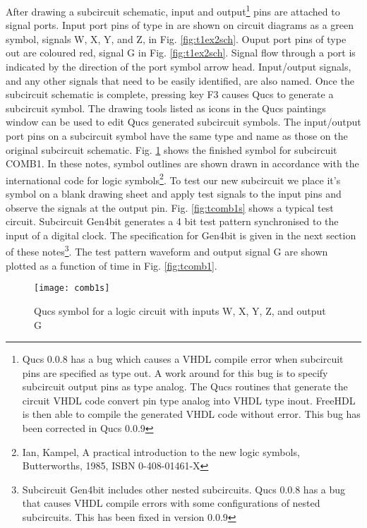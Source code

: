 After drawing a subcircuit schematic, input and output\footnote{Qucs
  0.0.8 has a bug which causes a VHDL compile error when subcircuit
  pins are specified as type out. A work around for this bug is to
  specify subcircuit output pins as type analog.  The Qucs routines
  that generate the circuit VHDL code convert pin type analog into
  VHDL type inout. FreeHDL is then able to compile the generated VHDL
  code without error. This bug has been corrected in Qucs 0.0.9} pins
are attached to signal ports.  Input port pins of type in are shown on
circuit diagrams as a green symbol, signals W, X, Y, and Z, in
Fig. \ref{fig:t1ex2sch}.  Ouput port pins of type out are coloured
red, signal G in Fig. \ref{fig:t1ex2sch}. Signal flow through a port
is indicated by the direction of the port symbol arrow
head. Input/output signals, and any other signals that need to be
easily identified, are also named.  Once the subcircuit schematic is
complete, pressing key F3 causes Qucs to generate a subcircuit symbol.
The drawing tools listed as icons in the Qucs paintings window can be
used to edit Qucs generated subcircuit symbols.  The input/output port
pins on a subcircuit symbol have the same type and name as those on
the original subcircuit schematic.  Fig. \ref{fig:comb1s} shows the
finished symbol for subcircuit COMB1. In these notes, symbol outlines
are shown drawn in accordance with the international code for logic
symbols\footnote{Ian, Kampel, A practical introduction to the new
  logic symbols, Butterworths, 1985, ISBN 0-408-01461-X}. To test our
new subcircuit we place it's symbol on a blank drawing sheet and apply
test signals to the input pins and observe the signals at the output
pin.  Fig. \ref{fig:tcomb1s} shows a typical test circuit.  Subcircuit
Gen4bit generates a 4 bit test pattern synchronised to the input of a
digital clock. The specification for Gen4bit is given in the next
section of these notes\footnote{Subcircuit Gen4bit includes other
  nested subcircuits.  Qucs 0.0.8 has a bug that causes VHDL compile
  errors with some configurations of nested subcircuits. This has been
  fixed in version 0.0.9 }.  The test pattern waveform and output
signal G are shown plotted as a function of time in
Fig. \ref{fig:tcomb1}.

\begin{figure}
  \centering
  \texttt{[image: comb1s]}
  \caption{Qucs symbol for a logic circuit with inputs W, X, Y, Z, and output G}
  \label{fig:comb1s}
\end{figure}
\FloatBarrier

